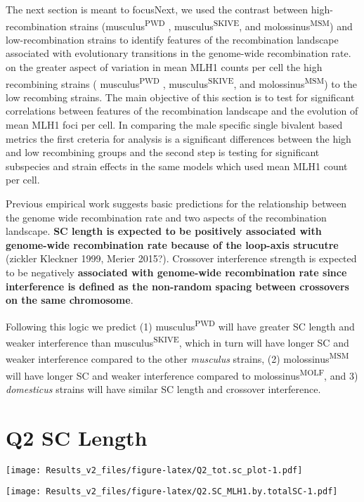 \documentclass[]{article}
\begin{document}
The next section is meant to focusNext, we used the contrast between
high-recombination strains (musculus\textsuperscript{PWD} ,
musculus\textsuperscript{SKIVE}, and molossinus\textsuperscript{MSM})
and low-recombination strains to identify features of the recombination
landscape associated with evolutionary transitions in the genome-wide
recombination rate. on the greater aspect of variation in mean MLH1
counts per cell the high recombining strains (
musculus\textsuperscript{PWD} , musculus\textsuperscript{SKIVE}, and
molossinus\textsuperscript{MSM}) to the low recombing strains. The main
objective of this section is to test for significant correlations
between features of the recombination landscape and the evolution of
mean MLH1 foci per cell. In comparing the male specific single bivalent
based metrics the first creteria for analysis is a significant
differences between the high and low recombining groups and the second
step is testing for significant subspecies and strain effects in the
same models which used mean MLH1 count per cell.

Previous empirical work suggests basic predictions for the relationship
between the genome wide recombination rate and two aspects of the
recombination landscape. \textbf{SC length is expected to be positively
associated with genome-wide recombination rate because of the loop-axis
strucutre} (zickler Kleckner 1999, Merier 2015?). Crossover interference
strength is expected to be negatively \textbf{associated with
genome-wide recombination rate since interference is defined as the
non-random spacing between crossovers on the same chromosome}.

Following this logic we predict (1) musculus\textsuperscript{PWD} will
have greater SC length and weaker interference than
musculus\textsuperscript{SKIVE}, which in turn will have longer SC and
weaker interference compared to the other \emph{musculus} strains, (2)
molossinus\textsuperscript{MSM} will have longer SC and weaker
interference compared to molossinus\textsuperscript{MOLF}, and 3)
\emph{domesticus} strains will have similar SC length and crossover
interference.

\section{Q2 SC Length}\label{q2-sc-length}

\texttt{[image: Results\_v2\_files/figure-latex/Q2\_tot.sc\_plot-1.pdf]}

\texttt{[image: Results\_v2\_files/figure-latex/Q2.SC\_MLH1.by.totalSC-1.pdf]}
\end{document}
